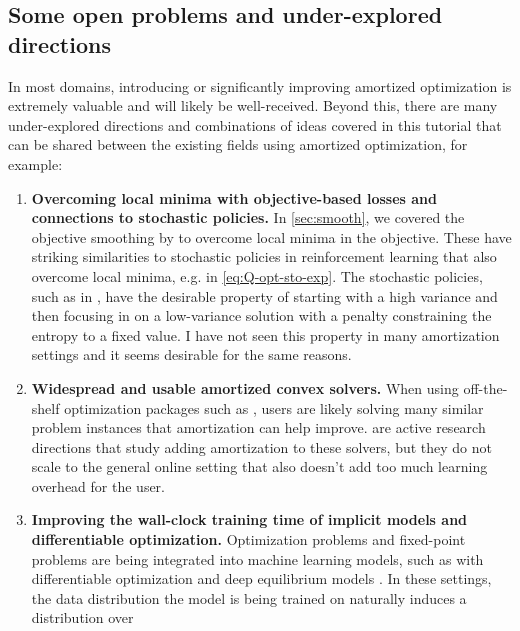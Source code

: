 \documentclass[twoside,11pt]{article}
\newcommand{\eg}{e.g.\xspace}
\begin{document}
\subsection{Some open problems and under-explored directions}
In most domains, introducing or significantly improving amortized
optimization is extremely valuable and will likely be well-received.
Beyond this, there are many under-explored directions and
combinations of ideas covered in this tutorial that can
be shared between the existing fields using amortized optimization,
for example:

\begin{enumerate}
\item \textbf{Overcoming local minima with objective-based losses
    and connections to stochastic policies.}
  In \cref{sec:smooth}, we covered the objective smoothing by
  \citet{metz2019understanding,merchant2021learn2hop}
  to overcome local minima in the objective.
  These have striking similarities to stochastic policies
  in reinforcement learning that also overcome local
  minima, \eg in \cref{eq:Q-opt-sto-exp}.
  The stochastic policies, such as in \citet{haarnoja2018soft},
  have the desirable property of starting with a high variance
  and then focusing in on a low-variance solution with a
  penalty constraining the entropy to a fixed value.
  I have not seen this property in many
  amortization settings and it seems desirable for the same reasons.
\item \textbf{Widespread and usable amortized convex solvers.}
  When using off-the-shelf optimization packages such as
  \citet{diamond2016cvxpy,o2016conic,stellato2018osqp},
  users are likely solving many similar problem instances
  that amortization can help improve.
  \citet{venkataraman2021neural,ichnowski2021accelerating}
  are active research directions that study adding
  amortization to these solvers, but they do not scale
  to the general online setting that also doesn't
  add too much learning overhead for the user.
\item \textbf{Improving the wall-clock training time
    of implicit models and differentiable optimization.}
  Optimization problems and fixed-point problems
  are being integrated into machine learning models,
  such as with differentiable optimization
  \citep{domke2012generic,gould2016differentiating,amos2017optnet,amos2019differentiable,agrawal2019differentiable,lee2019meta}
  and deep equilibrium models
  \citep{bai2019deep,bai2020multiscale}.
  In these settings, the data distribution the model
  is being trained on naturally induces a distribution over

\end{enumerate}
\end{document}
